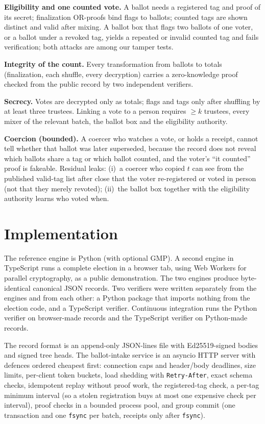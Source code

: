 \documentclass[runningheads]{llncs}
\begin{document}
\textbf{Eligibility and one counted vote.} A ballot needs a registered tag and proof of its secret; finalization OR-proofs bind flags to ballots; counted tags are shown distinct and valid after mixing. A ballot box that flags two ballots of one voter, or a ballot under a revoked tag, yields a repeated or invalid counted tag and fails verification; both attacks are among our tamper tests.

\textbf{Integrity of the count.} Every transformation from ballots to totals (finalization, each shuffle, every decryption) carries a zero-knowledge proof checked from the public record by two independent verifiers.

\textbf{Secrecy.} Votes are decrypted only as totals; flags and tags only after shuffling by at least three trustees. Linking a vote to a person requires $\geq k$ trustees, every mixer of the relevant batch, the ballot box and the eligibility authority.

\textbf{Coercion (bounded).} A coercer who watches a vote, or holds a receipt, cannot tell whether that ballot was later superseded, because the record does not reveal which ballots share a tag or which ballot counted, and the voter's ``it counted'' proof is fakeable. Residual leaks: (i)~a coercer who copied $t$ can see from the published valid-tag list after close that the voter re-registered or voted in person (not that they merely revoted); (ii)~the ballot box together with the eligibility authority learns who voted when.

\section{Implementation}\label{sec:impl}

The reference engine is Python (with optional GMP). A second engine in TypeScript runs a complete election in a browser tab, using Web Workers for parallel cryptography, as a public demonstration. The two engines produce byte-identical canonical JSON records. Two verifiers were written separately from the engines and from each other: a Python package that imports nothing from the election code, and a TypeScript verifier. Continuous integration runs the Python verifier on browser-made records and the TypeScript verifier on Python-made records.

The record format is an append-only JSON-lines file with Ed25519-signed bodies and signed tree heads. The ballot-intake service is an asyncio HTTP server with defences ordered cheapest first: connection caps and header/body deadlines, size limits, per-client token buckets, load shedding with \texttt{Retry-After}, exact schema checks, idempotent replay without proof work, the registered-tag check, a per-tag minimum interval (so a stolen registration buys at most one expensive check per interval), proof checks in a bounded process pool, and group commit (one transaction and one \texttt{fsync} per batch, receipts only after \texttt{fsync}).
\end{document}
